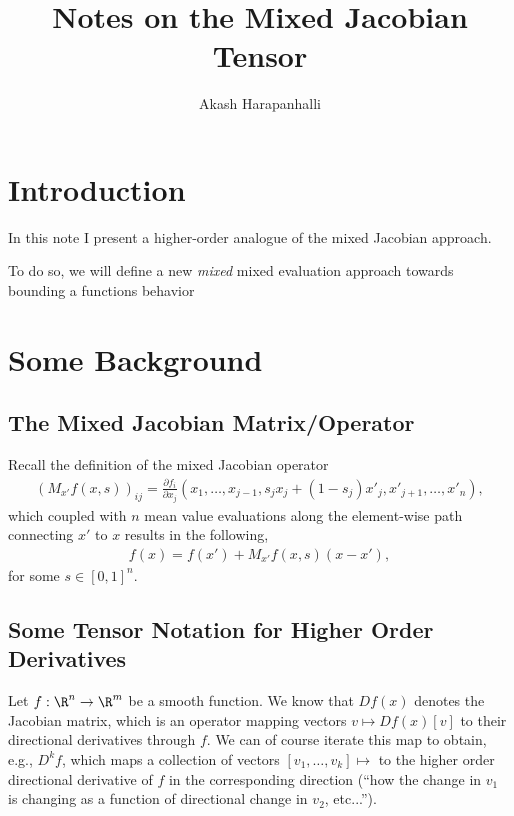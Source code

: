 \documentclass{article}
\title{Notes on the Mixed Jacobian Tensor}
\author{Akash Harapanhalli}
\theoremstyle{plain}
\theoremstyle{remark}
\begin{document}
\maketitle

\section{Introduction}
In this note I present a higher-order analogue of the mixed Jacobian approach.

To do so, we will define a new \emph{mixed }
mixed evaluation approach towards bounding a functions behavior

\section{Some Background}

\subsection{The Mixed Jacobian Matrix/Operator}

Recall the definition of the mixed Jacobian operator
\begin{align*}
    (M_{x'}f(x,s))_{ij} = \frac{\partial f_i}{\partial x_j} (x_1,\dots,x_{j-1},s_jx_j + (1-s_j)x'_j,x'_{j+1},\dots,x'_n),
\end{align*}
which coupled with $n$ mean value evaluations along the element-wise path connecting $x'$ to $x$ results in the following,
\begin{align*}
    f(x) = f(x') + M_{x'}f (x,s) (x - x'),
\end{align*}
for some $s\in[0,1]^n$. 

\subsection{Some Tensor Notation for Higher Order Derivatives}

Let $f:\R^n\to\R^m$ be a smooth function. We know that $Df(x)$ denotes the Jacobian matrix, which is an operator mapping vectors $v \mapsto Df(x)[v]$ to their directional derivatives through $f$. 
We can of course iterate this map to obtain, e.g., $D^kf$, which maps a collection of vectors $[v_1,\dots,v_k] \mapsto $ to the higher order directional derivative of $f$ in the corresponding direction (``how the change in $v_1$ is changing as a function of directional change in $v_2$, etc...'').
\end{document}
